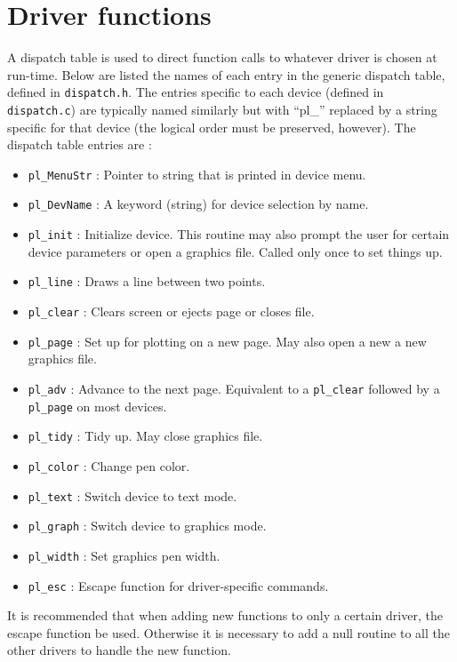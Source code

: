 \section{Driver functions}

A dispatch table is used to direct function calls to whatever driver is
chosen at run-time.  Below are listed the names of each entry in the generic
dispatch table, defined in {\tt dispatch.h}.  The entries specific to each
device (defined in {\tt dispatch.c}) are typically named similarly but with
``pl\_'' replaced by a string specific for that device (the logical order
must be preserved, however).  The dispatch table entries are :
\begin{itemize}
\item {\tt pl\_MenuStr} : Pointer to string that is printed in device menu.
\item {\tt pl\_DevName} : A keyword (string) for device selection by name.
\item {\tt pl\_init} : Initialize device.  
			This routine may also prompt the user
			for certain device parameters or open a graphics file.
			Called only once to set things up.
\item {\tt pl\_line} : Draws a line between two points.
\item {\tt pl\_clear} : Clears screen or ejects page or closes file.
\item {\tt pl\_page} : Set up for plotting on a new page. 
			May also open a new a new graphics file.
\item {\tt pl\_adv} : Advance to the next page.  Equivalent to a {\tt pl\_clear}
			followed by a {\tt pl\_page} on most devices.
\item {\tt pl\_tidy} : Tidy up. May close graphics file.
\item {\tt pl\_color} : Change pen color.
\item {\tt pl\_text} : Switch device to text mode.
\item {\tt pl\_graph} : Switch device to graphics mode.
\item {\tt pl\_width} : Set graphics pen width.
\item {\tt pl\_esc} : Escape function for driver-specific commands.
\end{itemize}

It is recommended that when adding new functions to only a certain driver,
the escape function be used.  Otherwise it is necessary to add a null
routine to all the other drivers to handle the new function.

